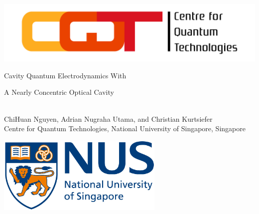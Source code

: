 \documentclass[portrait,a0,final]{a0poster} %
\newenvironment{poster}{
  \begin{center}
  \begin{minipage}[c]{0.98\textwidth}
}{
  \end{minipage}
  \end{center}
}
\begin{document}

\begin{poster}
\large \sf
\vspace{2cm}
\begin{center}

      \begin{minipage}[c]{0.05\textwidth}
        \begin{center}
          \includegraphics[width=14cm,angle=0]{CQT_Logo_CMYK.jpg}
        \end{center}
      \end{minipage}\hspace{10cm}
      \begin{minipage}[c]{0.7\textwidth}
        \begin{center}
          {\sc \huge Cavity Quantum Electrodynamics With  \\ \vspace{0.8cm}

A Nearly Concentric Optical Cavity}\\[9mm]
          {\large ChiHuan Nguyen, Adrian Nugraha Utama, and Christian Kurtsiefer}\\[6mm]
          Centre for Quantum Technologies, National University of Singapore, Singapore\\

        \end{center}
      \end{minipage}
      \begin{minipage}[l]{0.1\textwidth}
        \begin{center}
          \includegraphics[width=8cm,angle=0]{NUS_logo_full-horizontal.jpg}
        \end{center}
      \end{minipage}
\end{center}


\end{poster}
\end{document}
